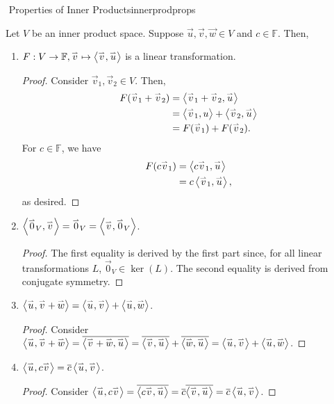         \begin{theorem}{\Stop\,\,Properties of Inner Products}{innerprodprops}

            Let \(V\) be an inner product space. Suppose \(\vec{u},\vec{v},\vec{w}\in V\) and \(c\in\mathbb{F}\). Then,
            \begin{enumerate}
                \item \(F:V\to \mathbb{F},\vec{v}\mapsto\iprod{\vec{v}}{\vec{u}}\) is a linear transformation.
                \begin{proof}
                    Consider \(\vec{v}_1,\vec{v}_2\in V\). Then,
                    \begin{align*}
                        F(\vec{v}_1+\vec{v}_2)&=\iprod{\vec{v}_1+\vec{v}_2}{\vec{u}} \\
                        &=\iprod{\vec{v}_1}{u}+\iprod{\vec{v}_2}{\vec{u}} \\
                        &=F(\vec{v}_1)+F(\vec{v}_2).
                    \end{align*}
                    For \(c\in\mathbb{F}\), we have
                    \begin{align*}
                        F(c\vec{v}_1)&=\iprod{c\vec{v}_1}{\vec{u}} \\
                        &=c\iprod{\vec{v}_1}{\vec{u}},
                    \end{align*}
                    as desired.
                \end{proof}
                \item \(\iprod{\vec{0}_V}{\vec{v}}=\vec{0}_V=\iprod{\vec{v}}{\vec{0}_V}\).
                \begin{proof}
                    The first equality is derived by the first part since, for all linear transformations \(L\), \(\vec{0}_V\in\ker(L)\). The second equality is derived from conjugate symmetry.
                \end{proof}
                \item \(\iprod{\vec{u}}{\vec{v}+\vec{w}}=\iprod{\vec{u}}{\vec{v}}+\iprod{\vec{u}}{\vec{w}}\).
                \begin{proof}
                    Consider \(\iprod{\vec{u}}{\vec{v}+\vec{w}}=\bar{\iprod{\vec{v}+\vec{w}}{\vec{u}}}=\bar{\iprod{\vec{v}}{\vec{u}}}+\bar{\iprod{\vec{w}}{\vec{u}}}=\iprod{\vec{u}}{\vec{v}}+\iprod{\vec{u}}{\vec{w}}\).
                \end{proof}
                \item \(\iprod{\vec{u}}{c\vec{v}}=\bar{c}\iprod{\vec{u}}{\vec{v}}\).
                \begin{proof}
                    Consider \(\iprod{\vec{u}}{c\vec{v}}=\bar{\iprod{c\vec{v}}{\vec{u}}}=\bar{c}\bar{\iprod{\vec{v}}{\vec{u}}}=\bar{c}\iprod{\vec{u}}{\vec{v}}\).
                \end{proof}
            \end{enumerate}
            
        \end{theorem}
